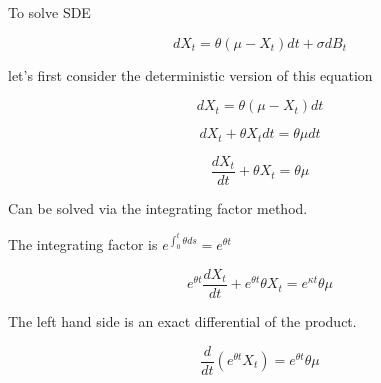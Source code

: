 \documentclass[c, dvipsnames, 8pt]{beamer}
\begin{document}
\begin{frame}[shrink=5]



To solve SDE

\begin{equation}\label{key}
dX_t = \theta ( \mu  - X_t)  dt + \sigma  d B_t
\end{equation}

let's first consider the deterministic version of this equation


\begin{equation}\label{key}
dX_t = \theta ( \mu  - X_t)  dt 
\end{equation}



\begin{equation}\label{key}
dX_t  + \theta  X_t dt = \theta  \mu    dt 
\end{equation}



\begin{equation}\label{key}
\dfrac{dX_t}{dt}  + \theta  X_t = \theta  \mu    
\end{equation}

Can be solved via the integrating factor method.

The integrating factor  is $e^{\int_0^t \theta ds } = e^{\theta t}$ 


\begin{equation}\label{key}
e^{\theta t} \dfrac{dX_t}{dt}  +  e^{\theta t} \theta  X_t = e^{\kappa t}  \theta  \mu    
\end{equation}

The left hand side is an exact differential of the product.

\begin{equation}\label{key}
\dfrac{d}{dt} (e^{\theta t} X_t )    = e^{\theta t}  \theta  \mu    
\end{equation}
	
	
\end{frame}
\end{document}
